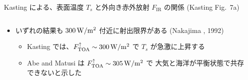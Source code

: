 \documentclass[aspectratio=149]{beamer}
\newcommand{\hmTOA}{\mathrm{TOA}}
\begin{document}
\begin{frame}
\begin{columns}[T,onlytextwidth]
\begin{column}{.3\textwidth}
			\tiny
			Kasting による、表面温度 \(T_s\) と外向き赤外放射 \(F_\mathrm{IR}\) の関係
			(Kasting Fig.~7a)
		\end{column}
	\end{columns}
	\begin{itemize}
		\item いずれの結果も \(300\hmu{W/m^2}\) 付近に射出限界がある
			(Nakajima \etal*, 1992)
			\begin{itemize}
				\item Kasting では、\(F^\uparrow_\hmTOA\sim300\hmu{W/m^2}\) で \(T_s\)
					が急激に上昇する
				\item Abe and Matusi は \(F^\uparrow_\hmTOA\sim305\hmu{W/m^2}\) で
					大気と海洋が平衡状態で共存できないと示した
			\end{itemize}
	\end{itemize}
\end{frame}
\end{document}
